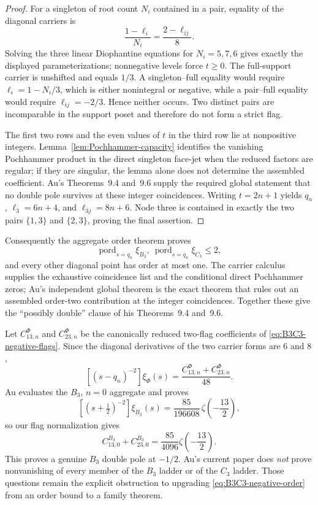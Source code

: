 \documentclass[11pt]{article}
\renewcommand{\boxed}[1]{#1}
\begin{document}
\begin{proof}
For a singleton of root count \(N_i\) contained in a pair, equality of
the diagonal carriers is
\[
 \frac{1-\ell_i}{N_i}=\frac{2-\ell_{ij}}8.
\]
Solving the three linear Diophantine equations for
\(N_i=5,7,6\) gives exactly the displayed parameterizations; nonnegative
levels force \(t\ge0\).  The full-support carrier is unshifted and equals
\(1/3\).  A singleton--full equality would require
\(\ell_i=1-N_i/3\), which is either nonintegral or negative, while a
pair--full equality would require \(\ell_{ij}=-2/3\).  Hence neither
occurs.  Two distinct pairs are incomparable in the support poset and
therefore do not form a strict flag.

The first two rows and the even values of \(t\) in the third row lie
at nonpositive integers.  Lemma~\ref{lem:Pochhammer-capacity} identifies
the vanishing Pochhammer product in the direct singleton face-jet when
the reduced factors are regular; if they are singular, the lemma alone
does not determine the assembled coefficient.  Au's
Theorems~9.4 and~9.6 supply the required global statement that no
double pole survives at these integer coincidences.  Writing
\(t=2n+1\) yields \(q_n\), \(\ell_3=6n+4\), and
\(\ell_{3j}=8n+6\).  Node three is contained in exactly the two pairs
\(\{1,3\}\) and \(\{2,3\}\), proving the final assertion.
\end{proof}

Consequently the aggregate order theorem proves
\begin{equation}\label{eq:B3C3-negative-order}
 \operatorname{pord}_{s=q_n}\xi_{B_3},\ 
 \operatorname{pord}_{s=q_n}\xi_{C_3}\le2,
\end{equation}
and every other diagonal point has order at most one.  The carrier
calculus supplies the exhaustive coincidence list and the conditional
direct Pochhammer zeros; Au's independent global theorem is the exact
theorem that rules out an assembled order-two contribution at the integer
coincidences.  Together these give the ``possibly double'' clause of his
Theorems~9.4 and~9.6.

Let \(C^{\Phi}_{13,n}\) and \(C^{\Phi}_{23,n}\) be the canonically
reduced two-flag coefficients of \eqref{eq:B3C3-negative-flags}.  Since
the diagonal derivatives of the two carrier forms are \(6\) and \(8\),
\begin{equation}\label{eq:B3C3-negative-coeff}
\boxed{
 [(s-q_n)^{-2}]\xi_\Phi(s)
 =\frac{C^{\Phi}_{13,n}+C^{\Phi}_{23,n}}{48}.}
\end{equation}
Au evaluates the \(B_3\), \(n=0\) aggregate and proves
\begin{equation}\label{eq:B3-minus-half}
\boxed{
 [(s+\tfrac12)^{-2}]\xi_{B_3}(s)
 =\frac{85}{196608}\,\zeta\!\left(-\frac{13}{2}\right),}
\end{equation}
so our flag normalization gives
\[
 C^{B_3}_{13,0}+C^{B_3}_{23,0}
 =\frac{85}{4096}\zeta\!\left(-\frac{13}{2}\right).
\]
This proves a genuine \(B_3\) double pole at \(-1/2\).  Au's current
paper does \emph{not} prove nonvanishing of every member of the
\(B_3\) ladder or of the \(C_3\) ladder.  Those questions remain the
explicit obstruction to upgrading \eqref{eq:B3C3-negative-order} from
an order bound to a family theorem.
\end{document}
